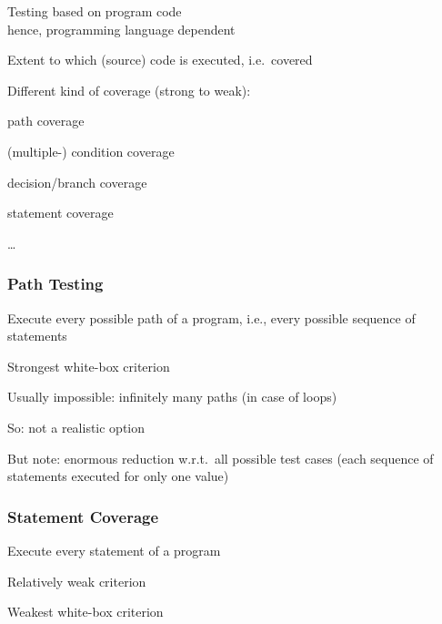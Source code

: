 \begin{itemize*}
	\item Testing based on program code\\
	hence, programming language dependent
	\item Extent to which (source) code is executed, i.e.\ covered
    \item Different kind of coverage (strong to weak):
	\begin{itemize*}
		\item path coverage
		\item (multiple-) condition coverage
		\item decision/branch coverage
		\item statement coverage
		\item \ldots
	\end{itemize*}
\end{itemize*}

\subsubsection{Path Testing}

\begin{itemize*}
	\item Execute every possible path of a program, i.e., every possible sequence of statements
	\item Strongest white-box criterion
	\item Usually impossible: infinitely many paths (in case of loops)
	\item So: not a realistic option
	\item But note: enormous reduction w.r.t.\ all possible test cases (each sequence of statements executed for only one value)
\end{itemize*}


\subsubsection{Statement Coverage}

\begin{itemize*}
	\item Execute every statement of a program
	\item Relatively weak criterion
	\item Weakest white-box criterion
\end{itemize*}


